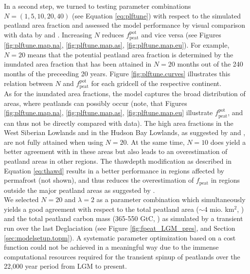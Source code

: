 \clearpage

In a second step, we turned to testing parameter combinations $N=(1,5,10,20,40)$ (see Equation \ref{eq:plftune}) with respect to the simulated peatland area fraction and assessed the model performance by visual comparison with data by \citet{tarnocai09gbc} and \citet{yu10grl}. Increasing $N$ reduces $f_{\text{peat}}^{\text{pot}}$ and vice versa (see Figures \ref{fig:plftune.map.na}, \ref{fig:plftune.map.as}, \ref{fig:plftune.map.eu}). For example, $N=20$ means that the potential peatland area fraction is determined by the inundated area fraction that has been attained in $N=20$ months out of the 240 months of the preceeding 20 years. Figure \ref{fig:plftune.curves} illustrates this relation between $N$ and $f_{\text{peat}}^{\text{pot}}$ for each gridcell of the respective continent.\\

As for the inundated area fractions, the model captures the broad distribution of areas, where peatlands can possibly occur (note, that Figures \ref{fig:plftune.map.na}, \ref{fig:plftune.map.as}, \ref{fig:plftune.map.eu} illustrate $f_{\text{peat}}^{\text{pot}}$, and can thus not be directly compared with \citet{tarnocai09gbc} data). The high area fractions in the West Siberian Lowlands and in the Hudson Bay Lowlands, as suggested by \citet{tarnocai09gbc} and \citet{yu10grl}, are not fully attained when using $N=20$. At the same time, $N=10$ does yield a better agreement with \citet{tarnocai09gbc} in these areas but also leads to an overestimation of peatland areas in other regions. The thawdepth modification as described in Equation \ref{eq:thawd} results in a better performance in regions affected by permafrost (not shown), and thus reduces the overestimation of $f_{\text{peat}}$ in regions outside the major peatland areas as suggested by \citet{tarnocai09gbc}.\\

We selected $N=20$ and $\lambda=2$ as a parameter combination which simultaneously yields a good agreement with respect to the total peatland area ($\sim$4 mio. km$^2$, \citet{yu10grl}) and the total peatland carbon mass (365-550 GtC, \citet{tarnocai09gbc,yu10grl}) as simulated by a transient run over the last Deglaciation (see Figure \ref{fig:fpeat_LGM_pres}, and Section \ref{sec:modelsetup.topm}). A systematic parameter optimization based on a cost function could not be achieved in a meaningful way due to the immense computational resources required for the transient spinup of peatlands over the 22,000 year period from LGM to present.\\


